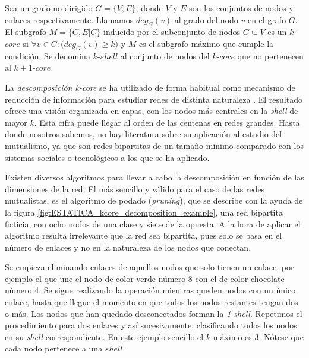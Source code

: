 \begin{theo} 
Sea un grafo no dirigido $G = \{V, E\}$, donde $V$ y $E$ son los conjuntos de nodos y enlaces respectivamente. Llamamos $deg_G(v)$ al grado del nodo $v$ en el grafo $G$. El subgrafo $M = \{C, E|C\}$ inducido por el subconjunto de nodos $C \subseteq V$ es
un $k$-$core$ si $\forall v \in C: \big( deg_G(v) \geq k \big)$ y $M$ es el subgrafo máximo que cumple la condición. Se denomina $k$-$shell$ al conjunto de nodos del $k$-$core$ que no pertenecen al $k+1$-$core$.
\label{ESTATICA_def_kcore}
\end{theo}

La \textit{descomposición k-core} se ha utilizado de forma habitual como mecanismo de reducción de información para estudiar redes de distinta naturaleza \cite{kitsak2010identification, zhang2010using, barbera2014critical}. El resultado ofrece una visión organizada en capas, con los nodos más centrales en la \textit{shell} de mayor $k$. Esta cifra puede llegar al orden de las centenas en redes grandes. Hasta donde nosotros sabemos, no hay literatura sobre su aplicación al estudio del mutualismo, ya que son redes bipartitas de un tamaño mínimo comparado con los sistemas sociales o tecnológicos a los que se ha aplicado.

Existen diversos algoritmos para llevar a cabo la descomposición en función de las dimensiones de la red\cite{montresor2013distributed}. El más sencillo y válido para el caso de las redes mutualistas, es el algoritmo de podado (\textit{pruning}), que se describe con la ayuda de la figura \ref{fig:ESTATICA_kcore_decomposition_example}, una red bipartita ficticia, con ocho nodos de una clase y siete de la opuesta. A la hora de aplicar el algoritmo resulta irrelevante que la red sea bipartita, pues solo se basa en el número de enlaces y no en la naturaleza de los nodos que conectan.

Se empieza eliminando enlaces de aquellos nodos que solo tienen un enlace, por ejemplo el que une el nodo de color verde número 8 con el de color chocolate número 4. Se sigue realizando la operación mientras queden nodos con un único enlace, hasta que llegue el momento en que todos los nodos restantes tengan dos o más. Los nodos que han quedado desconectados forman la \textit{1-shell}. Repetimos el procedimiento para dos enlaces y así sucesivamente, clasificando todos los nodos en su \textit{shell} correspondiente. En este ejemplo sencillo el $k$ máximo es 3. Nótese que cada nodo pertenece a una $shell$.

